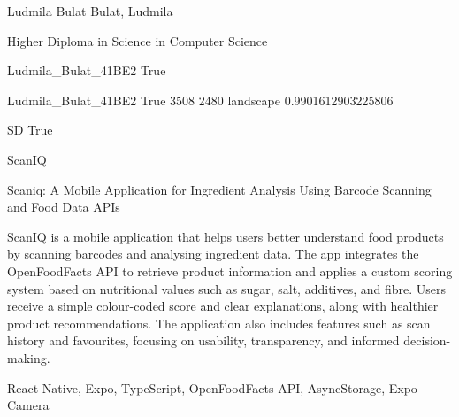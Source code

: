 \documentclass[twoside]{report}
\begin{document}
\begingroup{}\relax



\def\Key{Ludmila_Bulat_41BE2}

{Ludmila Bulat}
{Bulat, Ludmila}

{Higher Diploma in Science in Computer Science}

{Ludmila_Bulat_41BE2}
{True}

{Ludmila_Bulat_41BE2}
{True}
{3508}
{2480}
{landscape}
{0.9901612903225806}

{SD}
{True}

{ScanIQ}

{Scaniq: A Mobile Application for Ingredient Analysis Using Barcode Scanning and Food Data APIs}

{ScanIQ is a mobile application that helps users better understand food products by scanning barcodes and analysing ingredient data. The app integrates the OpenFoodFacts API to retrieve product information and applies a custom scoring system based on nutritional values such as sugar, salt, additives, and fibre. Users receive a simple colour-coded score and clear explanations, along with healthier product recommendations. The application also includes features such as scan history and favourites, focusing on usability, transparency, and informed decision-making.}

{React Native, Expo, TypeScript, OpenFoodFacts API, AsyncStorage, Expo Camera}
\end{document}
